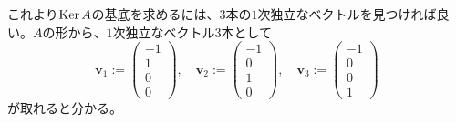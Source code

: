 これより$\operatorname{Ker} A$の基底を求めるには、$3$本の$1$次独立なベクトルを見つければ良い。$A$の形から、$1$次独立なベクトル$3$本として
\[
\bm{v}_1 :=
\begin{pmatrix}
-1 \\
1 \\
0 \\
0
\end{pmatrix}, \quad
\bm{v}_2 :=
\begin{pmatrix}
-1 \\
0 \\
1 \\
0
\end{pmatrix}, \quad
\bm{v}_3 :=
\begin{pmatrix}
-1 \\
0 \\
0 \\
1
\end{pmatrix}
\]
が取れると分かる。

